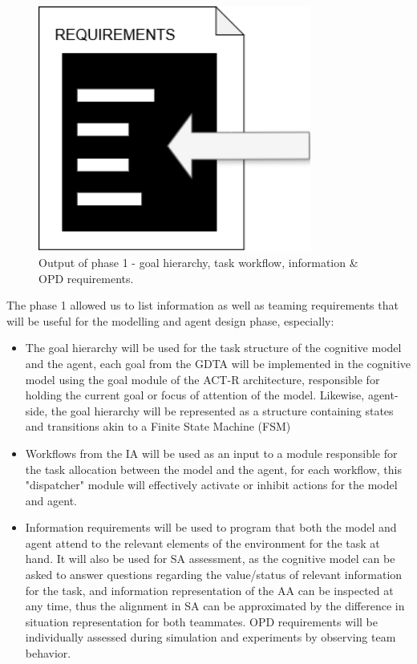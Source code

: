 \documentclass[12pt,a4paper]{article} %
\begin{document}
\begin{figure}[H]
\begin{minipage}[b]{0.3\textwidth}
		\end{minipage}
		\begin{minipage}[b]{0.3\textwidth}
			\centering
			\includegraphics[width=0.8\textwidth]{images/requirements.png}
		\end{minipage}
		\caption{Output of phase 1 - goal hierarchy, task workflow, information \& OPD requirements.}
		\label{fig:logos}
	\end{figure}

	The phase 1 allowed us to list information as well as teaming requirements that will be useful for the modelling and agent design phase, especially:

	\begin{itemize}
		\item The goal hierarchy will be used for the task structure of the cognitive model and the agent, each goal from the GDTA will be implemented in the cognitive model using the goal module of the ACT-R architecture, responsible for holding the current goal or focus of attention of the model. Likewise, agent-side, the goal hierarchy will be represented as a structure containing states and transitions akin to a Finite State Machine (FSM)
		\item Workflows from the IA will be used as an input to a module responsible for the task allocation between the model and the agent, for each workflow, this "dispatcher" module will effectively activate or inhibit actions for the model and agent.
		\item Information requirements will be used to program that both the model and agent attend to the relevant elements of the environment for the task at hand. It will also be used for SA assessment, as the cognitive model can be asked to answer questions regarding the value/status of relevant information for the task, and information representation of the AA can be inspected at any time, thus the alignment in SA can be approximated by the difference in situation representation for both teammates. OPD requirements will be individually assessed during simulation and experiments by observing team behavior.
	\end{itemize}
\end{document}
